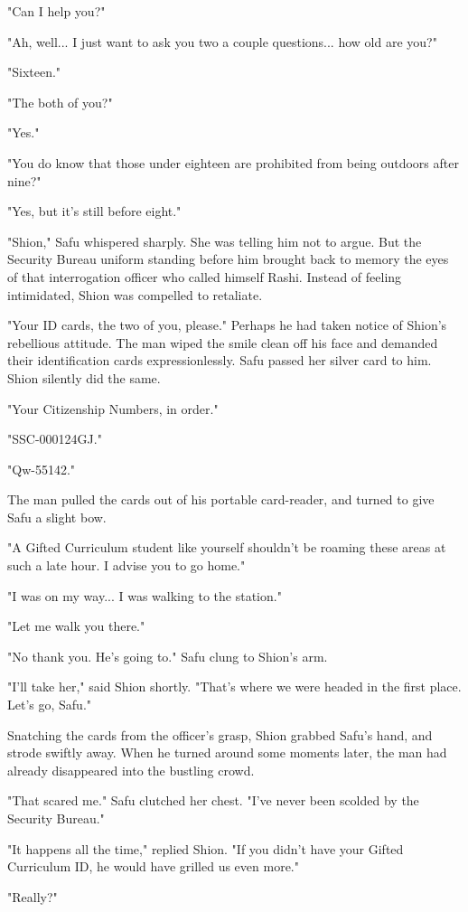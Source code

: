 "Can I help you?"

"Ah, well... I just want to ask you two a couple questions... how old
are you?"

"Sixteen."

"The both of you?"

"Yes."

"You do know that those under eighteen are prohibited from being
outdoors after nine?"

"Yes, but it's still before eight."

"Shion," Safu whispered sharply. She was telling him not to argue. But
the Security Bureau uniform standing before him brought back to memory
the eyes of that interrogation officer who called himself Rashi. Instead
of feeling intimidated, Shion was compelled to retaliate.

"Your ID cards, the two of you, please." Perhaps he had taken notice of
Shion's rebellious attitude. The man wiped the smile clean off his face
and demanded their identification cards expressionlessly. Safu passed
her silver card to him. Shion silently did the same.

"Your Citizenship Numbers, in order."

"SSC-000124GJ."

"Qw-55142."

The man pulled the cards out of his portable card-reader, and turned to
give Safu a slight bow.

"A Gifted Curriculum student like yourself shouldn't be roaming these
areas at such a late hour. I advise you to go home."

"I was on my way... I was walking to the station."

"Let me walk you there."

"No thank you. He's going to." Safu clung to Shion's arm.

"I'll take her," said Shion shortly. "That's where we were headed in the
first place. Let's go, Safu."

Snatching the cards from the officer's grasp, Shion grabbed Safu's hand,
and strode swiftly away. When he turned around some moments later, the
man had already disappeared into the bustling crowd.

"That scared me." Safu clutched her chest. "I've never been scolded by
the Security Bureau."~

"It happens all the time," replied Shion. "If you didn't have your
Gifted Curriculum ID, he would have grilled us even more."

"Really?"

